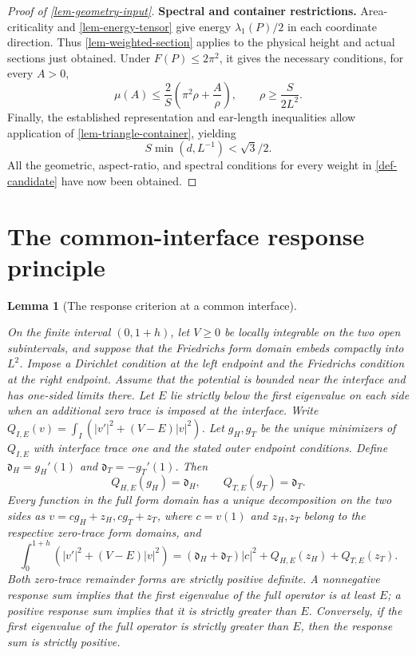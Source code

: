 \documentclass[11pt,a4paper]{article}
\theoremstyle{proofmanuscript}
\newtheorem{lemma}[theorem]{Lemma}
\begin{document}
\begin{proof}[Proof of \ref{lem-geometry-input}]
\textbf{Spectral and container restrictions.} Area-criticality and \ref{lem-energy-tensor} give energy \(\lambda_1(P)/2\) in each coordinate direction. Thus \ref{lem-weighted-section} applies to the physical height and actual sections just obtained. Under \(F(P)\le2\pi^2\), it gives the necessary conditions, for every \(A>0\), \[
\mu(A)\le\frac2S\left(\pi^2\rho+\frac A\rho\right),
\qquad \rho\ge\frac S{2L^2}.\tag{G.8.4}
\] Finally, the established representation and ear-length inequalities allow application of \ref{lem-triangle-container}, yielding \[
S\min(d,L^{-1})<\sqrt3/2.
\] All the geometric, aspect-ratio, and spectral conditions for every weight in \ref{def-candidate} have now been obtained.

\end{proof}


\section{The common-interface response principle}

\begin{lemma}[The response criterion at a common interface]\label{lem-interface}

On the finite interval \((0,1+h)\), let \(V\ge0\) be locally integrable on the two open subintervals, and suppose that the Friedrichs form domain embeds compactly into \(L^2\). Impose a Dirichlet condition at the left endpoint and the Friedrichs condition at the right endpoint. Assume that the potential is bounded near the interface and has one-sided limits there. Let \(E\) lie strictly below the first eigenvalue on each side when an additional zero trace is imposed at the interface. Write \(Q_{I,E}(v)=\int_I(|v'|^2+(V-E)|v|^2)\). Let \(g_H,g_T\) be the unique minimizers of \(Q_{I,E}\) with interface trace one and the stated outer endpoint conditions. Define \(\mathfrak d_H=g_H'(1)\) and \(\mathfrak d_T=-g_T'(1)\). Then \[
Q_{H,E}(g_H)=\mathfrak d_H,\qquad Q_{T,E}(g_T)=\mathfrak d_T.
\] Every function in the full form domain has a unique decomposition on the two sides as \(v=cg_H+z_H,cg_T+z_T\), where \(c=v(1)\) and \(z_H,z_T\) belong to the respective zero-trace form domains, and \[
\int_0^{1+h}(|v'|^2+(V-E)|v|^2)
=(\mathfrak d_H+\mathfrak d_T)|c|^2+Q_{H,E}(z_H)+Q_{T,E}(z_T).
\] Both zero-trace remainder forms are strictly positive definite. A nonnegative response sum implies that the first eigenvalue of the full operator is at least \(E\); a positive response sum implies that it is strictly greater than \(E\). Conversely, if the first eigenvalue of the full operator is strictly greater than \(E\), then the response sum is strictly positive.

\end{lemma}
\end{document}
